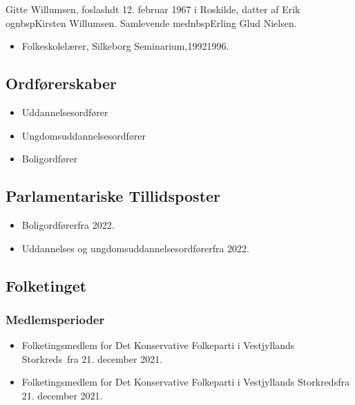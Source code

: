 \documentclass[11pt, a4paper]{awesome-cv}
\begin{document}
\makecvheader[R]
\makelettertitle
\begin{cvletter}
Gitte Willumsen, foslashdt 12. februar 1967 i Roskilde, datter af Erik ognbspKirsten Willumsen. Samlevende mednbspErling Glud Nielsen.

\begin{itemize}
\item Folkeskolelærer, Silkeborg Seminarium,19921996.
\end{itemize}
\subsection*{Ordførerskaber}
\begin{itemize}
\item Uddannelsesordfører
\item Ungdomsuddannelsesordfører
\item Boligordfører
\end{itemize}
\subsection*{Parlamentariske Tillidsposter}
\begin{itemize}
\item Boligordførerfra 2022.
\item Uddannelses og ungdomsuddannelsesordførerfra 2022.
\end{itemize}
\subsection*{Folketinget}
\subsubsection*{Medlemsperioder}
\begin{itemize}
\item Folketingsmedlem for Det Konservative Folkeparti i Vestjyllands Storkreds fra 21. december 2021.
\item Folketingsmedlem for Det Konservative Folkeparti i Vestjyllands Storkredsfra 21. december 2021.
\end{itemize}

\end{cvletter}
\end{document}
